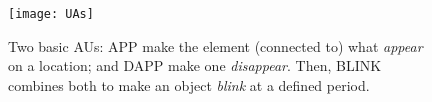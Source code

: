 \begin{figure}[t]%
   \centering
   \texttt{[image: UAs]}%
   \caption{Two basic AUs: \textsf{APP} make the element (connected to) \textsf{what}
   \emph{appear} \textsf{on} a location; and \textsf{DAPP} make one \emph{disappear}. Then,
   \textsf{BLINK} combines both to make an object \emph{blink} at a defined
   \textsf{period}.
   }%
   \label{fig:UA-Param}%
\end{figure}